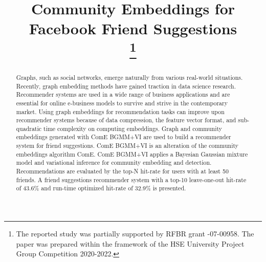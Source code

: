 \documentclass[conference]{IEEEtran}
\begin{document}
\title{Community Embeddings for Facebook Friend Suggestions\\
    \thanks{The reported study was partially supported by RFBR grant -07-00958. The paper was prepared within the framework of the HSE University Project Group Competition 2020-2022.}
}

\author{
    \and
}

\maketitle

\begin{abstract}
    Graphs, such as social networks, emerge naturally from various real-world situations. Recently, graph embedding methods have gained traction in data science research.
    Recommender systems are used in a wide range of business applications and are essential for online e-business models to survive and strive in the contemporary market. Using graph embeddings for recommendation tasks can improve upon recommender systems because of data compression, the feature vector format, and sub-quadratic time complexity on computing embeddings.
    Graph and community embeddings generated with ComE BGMM+VI are used to build a recommender system for friend suggestions. ComE BGMM+VI is an alteration of the community embeddings algorithm ComE. ComE BGMM+VI applies a Bayesian Gaussian mixture model and variational inference for community embedding and detection.
    Recommendations are evaluated by the top-N hit-rate for users with at least 50 friends. A friend suggestions recommender system with a top-10 leave-one-out hit-rate of 43.6\% and run-time optimized hit-rate of 32.9\% is presented.
\end{abstract}
\end{document}
